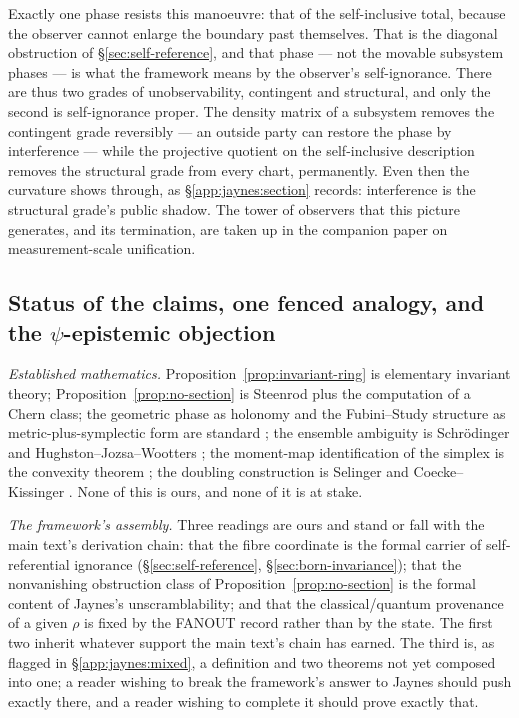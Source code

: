 Exactly one phase resists this manoeuvre: that of the self-inclusive
total, because the observer cannot enlarge the boundary past
themselves. That is the diagonal obstruction of
\S\ref{sec:self-reference}, and that phase --- not the movable
subsystem phases --- is what the framework means by the observer's
self-ignorance. There are thus two grades of unobservability,
contingent and structural, and only the second is self-ignorance
proper. The density matrix of a subsystem removes the contingent grade
reversibly --- an outside party can restore the phase by interference
--- while the projective quotient on the self-inclusive description
removes the structural grade from every chart, permanently. Even then
the curvature shows through, as \S\ref{app:jaynes:section} records:
interference is the structural grade's public shadow. The tower of
observers that this picture generates, and its termination, are taken
up in the companion paper on measurement-scale unification.

\subsection{Status of the claims, one fenced analogy, and the
  \texorpdfstring{$\psi$}{psi}-epistemic objection}
\label{app:jaynes:status}

\emph{Established mathematics.} Proposition~\ref{prop:invariant-ring}
is elementary invariant theory; Proposition~\ref{prop:no-section} is
Steenrod plus the computation of a Chern class; the geometric phase as
holonomy and the Fubini--Study structure as metric-plus-symplectic
form are standard \autocite{berry1984quantal, simon1983holonomy,
wooters_1981, bengtsson2006geometry}; the ensemble
ambiguity is Schr\"odinger and Hughston--Jozsa--Wootters
\autocite{schrodinger1936probability, hughston1993ensemble}; the
moment-map identification of the simplex is the convexity theorem
\autocite{atiyah1982convexity}; the doubling construction is Selinger
and Coecke--Kissinger \autocite{selinger2007dagger,
CoeckeKissinger2017}. None of this is ours, and none of it is at
stake.

\emph{The framework's assembly.} Three readings are ours and stand or
fall with the main text's derivation chain: that the fibre coordinate
is the formal carrier of self-referential ignorance
(\S\ref{sec:self-reference}, \S\ref{sec:born-invariance}); that the nonvanishing
obstruction class of Proposition~\ref{prop:no-section} is the formal
content of Jaynes's unscramblability; and that the classical/quantum
provenance of a given $\rho$ is fixed by the FANOUT record rather than
by the state. The first two inherit whatever support the main text's
chain has earned. The third is, as flagged in
\S\ref{app:jaynes:mixed}, a definition and two theorems not yet
composed into one; a reader wishing to break the framework's answer to
Jaynes should push exactly there, and a reader wishing to complete it
should prove exactly that.

